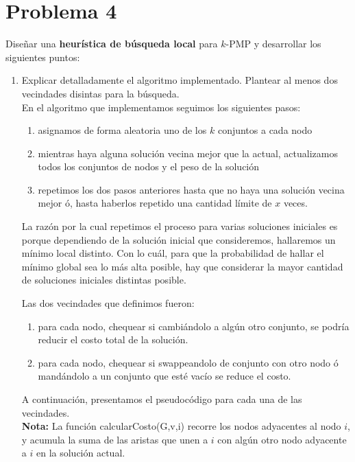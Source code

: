 \documentclass[11pt, a4paper, twoside]{article}
\begin{document}


\newpage
\section{Problema 4} 
	
	Diseñar una \textbf{heurística de búsqueda local} para $k$-PMP y desarrollar los siguientes puntos:
    \begin{enumerate}
    
		\item Explicar detalladamente el algoritmo implementado. Plantear al menos dos vecindades disintas
		para la búsqueda. \\
		En el algoritmo que implementamos seguimos los siguientes pasos:
		\begin{enumerate}
			\item asignamos de forma aleatoria uno de los $k$ conjuntos a cada nodo
			\item mientras haya alguna solución vecina mejor que la actual, actualizamos todos los
			      conjuntos de nodos y el peso de la solución
			\item repetimos los dos pasos anteriores hasta que no haya una solución vecina mejor ó, hasta
			      haberlos repetido una cantidad límite de $x$ veces.
		\end{enumerate}
		
		La razón por la cual repetimos el proceso para varias soluciones iniciales es porque dependiendo
		de la solución inicial que consideremos, hallaremos un mínimo local distinto. Con lo cuál, para
		que la probabilidad de hallar el mínimo global sea lo más alta posible, hay que considerar 
		la mayor cantidad de soluciones iniciales distintas posible.
		
		Las dos vecindades que definimos fueron:
		\begin{enumerate}
			\item para cada nodo, chequear si cambiándolo a algún otro conjunto, se podría reducir el costo
			      total de la solución.
			\item para cada nodo, chequear si swappeandolo de conjunto con otro nodo ó mandándolo a un conjunto que esté
			      vacío se reduce el costo.
		\end{enumerate}
		
		A continuación, presentamos el pseudocódigo para cada una de las vecindades. \\
		\textbf{Nota: } La función calcularCosto(G,v,i) recorre los nodos adyacentes al nodo $i$, y acumula la suma
	         		    de las aristas que unen a $i$ con algún otro nodo adyacente a $i$ en la solución actual.
      \begin{algorithm}[H]
			  

\end{algorithm}
\end{enumerate}
\end{document}
